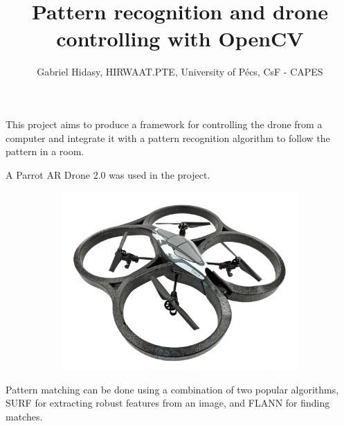 \documentclass[pdf]{beamer}
\title{Pattern recognition and drone controlling with OpenCV}
\author{Gabriel Hidasy, HIRWAAT.PTE, University of Pécs, CsF - CAPES}
\begin{document}
\begin{frame}
\titlepage
\end{frame}
\begin{frame}
	This project aims to produce a framework for controlling the drone from
a computer and integrate it with a pattern recognition algorithm to follow the
pattern in a room.
\end{frame}
\begin{frame}
	A Parrot AR Drone 2.0 was used in the project.
\begin{figure}[hbtp]
  \centering
\begin{subfigure}{.99\textwidth}
  \centering
  \includegraphics[width=.8\linewidth]{drone.jpg}
\end{subfigure}
\end{figure}
\end{frame}

\begin{frame}
Pattern matching can be done using a combination of two popular algorithms, SURF
for extracting robust features from an image, and FLANN for finding matches.
\end{frame}
\end{document}
